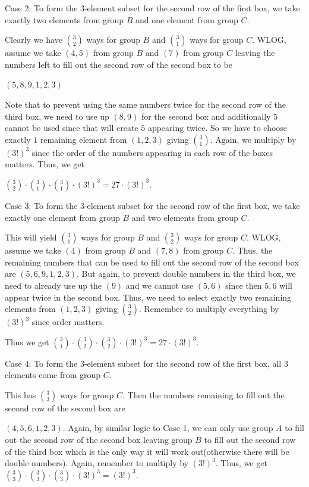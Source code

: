 \begin{enumerate}
 Case 2: To form the $3$-element subset for the second row of the first box, we take exactly two elements from group $B$ and one element from group $C$.

 Clearly we have $\binom{3}{2}$ ways for group $B$ and $\binom{3}{1}$ ways for group $C$. WLOG, assume we take $(4, 5)$ from group $B$ and $(7)$ from group $C$ leaving the numbers left to fill out the second row of the second box to be

 $(5, 8, 9, 1, 2, 3)$ 

 Note that to prevent using the same numbers twice for the second row of the third box, we need to use up $(8, 9)$ for the second box and additionally $5$ cannot be used since that will create $5$ appearing twice. So we have to choose exactly $1$ remaining element from $(1, 2, 3)$ giving $\binom{3}{1}$. Again, we multiply by $(3!)^3$ since the order of the numbers appearing in each row of the boxes matters. Thus, we get

 $\binom{3}{2} \cdot \binom{3}{1} \cdot \binom{3}{1} \cdot (3!)^3 = 27 \cdot (3!)^3$.

 Case 3: To form the $3$-element subset for the second row of the first box, we take exactly one element from group $B$ and two elements from group $C$.

 This will yield $\binom{3}{1}$ ways for group $B$ and $\binom{3}{2}$ ways for group $C$. WLOG, assume we take $(4)$ from group $B$ and $(7, 8)$ from group $C$. Thus, the remaining numbers that can be used to fill out the second row of the second box are $(5, 6, 9, 1, 2, 3)$. But again, to prevent double numbers in the third box, we need to already use up the $(9)$ and we cannot use $(5, 6)$ since then $5, 6$ will appear twice in the second box. Thus, we need to select exactly two remaining elements from $(1, 2, 3)$ giving $\binom{3}{2}$. Remember to multiply everything by $(3!)^3$ since order matters.

 Thus we get $\binom{3}{1} \cdot \binom{3}{2} \cdot \binom{3}{2} \cdot (3!)^3 = 27 \cdot (3!)^3$.

 Case 4: To form the $3$-element subset for the second row of the first box, all $3$ elements come from group $C$. 

 This has $\binom{3}{3}$ ways for group $C$. Then the numbers remaining to fill out the second row of the second box are

 $(4, 5, 6, 1, 2, 3)$. Again, by similar logic to Case 1, we can only use group $A$ to fill out the second row of the second box leaving group $B$ to fill out the second row of the third box which is the only way it will work out(otherwise there will be double numbers). Again, remember to multiply by $(3!)^3$. Thus, we get $\binom{3}{3} \cdot \binom{3}{3} \cdot \binom{3}{3} \cdot (3!)^3 = (3!)^3$.


\end{enumerate}
